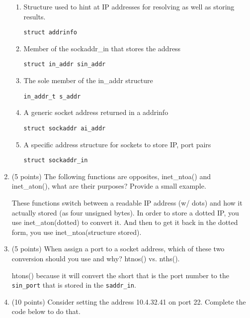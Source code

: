\documentclass{article}[9pt]
\newenvironment{myanswer}{\begin{mdframed}\begin{answerfont}}{\end{answerfont}\end{mdframed}}
\begin{document}
\begin{enumerate}
\begin{enumerate}
\item Structure used to hint at IP addresses for resolving as well
as storing results.
\begin{myanswer}
\texttt{struct addrinfo}
\end{myanswer}

\item Member of the sockaddr\_in that stores the address
\begin{myanswer}
\texttt{struct in\_addr sin\_addr}
\end{myanswer}

\item The sole member of the in\_addr structure
\begin{myanswer}
\texttt{in\_addr\_t s\_addr}
\end{myanswer}

\item A generic socket address returned in a addrinfo
\begin{myanswer}
\texttt{struct sockaddr ai\_addr}
\end{myanswer}

\item A specific address structure for sockets to store IP, port pairs
\begin{myanswer}
\texttt{struct sockaddr\_in}
\end{myanswer}

\end{enumerate}
\item (5 points) The following functions are opposites, inet\_ntoa() and
inet\_aton(), what are their purposes? Provide a small
example.
\begin{myanswer}
These functions switch between a readable IP address (w/ dots) and how
it actually stored (as four unsigned bytes). In order to store a dotted
IP, you use inet\_aton(dotted) to convert it.  And then to get it back
in the dotted form, you use inet\_ntoa(structure stored).
\end{myanswer}

\item (5 points) When assign a port to a socket address, which of these two
conversion should you use and why? htnos() vs. nths().
\begin{myanswer}
htons() because it will convert the short that is the port number to the
\texttt{sin\_port} that is stored in the \texttt{saddr\_in}.
\end{myanswer}

\item 
(10 points) Consider setting the address 10.4.32.41 on port 22. Complete
the code below to do that.




\end{enumerate}
\end{document}
